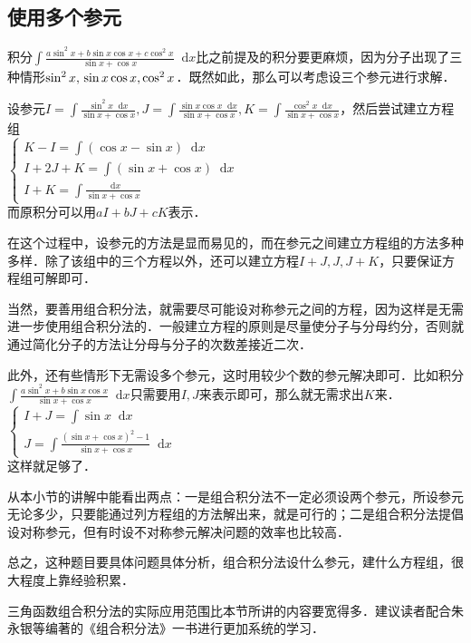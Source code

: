\documentclass{ctexbook}
\newcommand*{\dif}{\mathop{}\!\mathrm{d}}
\begin{document}
\subsection{使用多个参元}
积分$\int\frac{a\sin^{2}{x}+b\sin{x}\cos{x}+c\cos^{2}{x}}{\sin{x}+\cos{x}}\dif{x}$比之前提及的积分要更麻烦，因为分子出现了三种情形$\sin^{2}{x},\\\sin{x}\cos{x},\cos^{2}{x}$．既然如此，那么可以考虑设三个参元进行求解．\par
设参元$I=\int\frac{\sin^{2}{x}\dif{x}}{\sin{x}+\cos{x}},J=\int\frac{\sin{x}\cos{x}\dif{x}}{\sin{x}+\cos{x}},K=\int\frac{\cos^{2}{x}\dif{x}}{\sin{x}+\cos{x}}$，然后尝试建立方程组\\
$\begin{cases}K-I=\int\left(\cos{x}-\sin{x}\right)\dif{x}\\I+2J+K=\int\left(\sin{x}+\cos{x}\right)\dif{x}\\I+K=\int\frac{\dif{x}}{\sin{x}+\cos{x}}\end{cases}$\\
而原积分可以用$aI+bJ+cK$表示．\par
在这个过程中，设参元的方法是显而易见的，而在参元之间建立方程组的方法多种多样．除了该组中的三个方程以外，还可以建立方程$I+J,J,J+K$，只要保证方程组可解即可．\par
当然，要善用组合积分法，就需要尽可能设对称参元之间的方程，因为这样是无需进一步使用组合积分法的．一般建立方程的原则是尽量使分子与分母约分，否则就通过简化分子的方法让分母与分子的次数差接近二次．\par
此外，还有些情形下无需设多个参元，这时用较少个数的参元解决即可．比如积分$\int\frac{a\sin^{2}{x}+b\sin{x}\cos{x}}{\sin{x}+\cos{x}}\dif{x}$只需要用$I,J$来表示即可，那么就无需求出$K$来．\\
$\begin{cases}I+J=\int\sin{x}\dif{x}\\J=\int\frac{\left(\sin{x}+\cos{x}\right)^{2}-1}{\sin{x}+\cos{x}}\dif{x}\end{cases}$\\
这样就足够了．\par
从本小节的讲解中能看出两点：一是组合积分法不一定必须设两个参元，所设参元无论多少，只要能通过列方程组的方法解出来，就是可行的；二是组合积分法提倡设对称参元，但有时设不对称参元解决问题的效率也比较高．\par
总之，这种题目要具体问题具体分析，组合积分法设什么参元，建什么方程组，很大程度上靠经验积累．\par
三角函数组合积分法的实际应用范围比本节所讲的内容要宽得多．建议读者配合朱永银等编著的《组合积分法》一书进行更加系统的学习．\par
\end{document}
